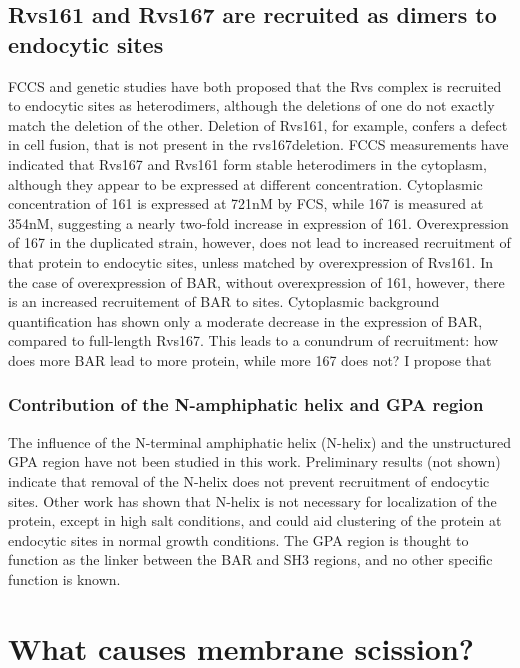 \subsection{Rvs161 and Rvs167 are recruited as dimers to endocytic sites}
FCCS and genetic studies have both proposed that the Rvs complex is recruited to endocytic sites as heterodimers, although the deletions of one do not exactly match the deletion of the other. Deletion of Rvs161, for example, confers a defect in cell fusion, that is not present in the rvs167deletion. FCCS measurements have indicated that Rvs167 and Rvs161 form stable heterodimers in the cytoplasm, although they appear to be expressed at different concentration. Cytoplasmic concentration of 161 is expressed at 721nM by FCS, while 167 is measured at 354nM, suggesting a nearly two-fold increase in expression of 161. Overexpression of 167 in the duplicated strain, however, does not lead to increased recruitment of that protein to endocytic sites, unless matched by overexpression of Rvs161. In the case of overexpression of BAR, without overexpression of 161, however, there is an increased recruitement of BAR to sites. Cytoplasmic background quantification has shown only a moderate decrease in the expression of BAR, compared to full-length Rvs167. This leads to a conundrum of recruitment: how does more BAR lead to more protein, while more 167 does not? I propose that 

\subsubsection{Contribution of the N-amphiphatic helix and GPA region}
The influence of the N-terminal amphiphatic helix (N-helix) and the unstructured GPA region have not been studied in this work. Preliminary results (not shown) indicate that removal of the N-helix does not prevent recruitment of endocytic sites. Other work has shown that N-helix is not necessary for localization of the protein, except in high salt conditions, and could aid clustering of the protein at endocytic sites in normal growth conditions. The GPA region is thought to function as the linker between the BAR and SH3 regions, and no other specific function is known. 

\section{What causes membrane scission?}


